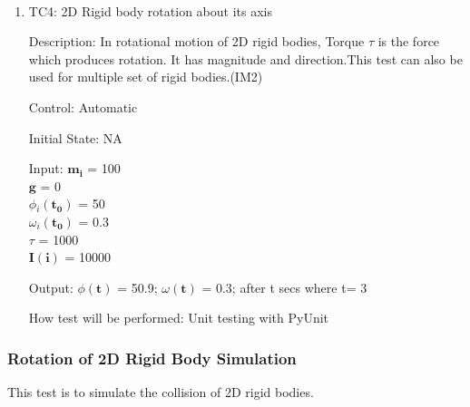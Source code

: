 \documentclass[12pt, titlepage]{article}
\begin{document}
\paragraph{}
\begin{enumerate}
	
	\item{TC4: 2D Rigid body rotation about its axis\\}
	
	Description: In rotational motion of 2D rigid bodies, Torque $\tau$ is the force which produces rotation. It has magnitude and direction.This test can also be used for multiple set of rigid bodies.(IM2)
	
	Control: Automatic
	
	Initial State: NA
	
	Input: $\mathbf{m_i}$$\mathbf{}$ = 100\\
	\hspace*{1.3cm}$\mathbf{g}$$\mathbf{}$ = 0\\
	\hspace*{1.3cm}$\phi$$_i\mathbf{(t_0)}$ = 50\\
	\hspace*{1.3cm}$\omega$$_i\mathbf{(t_0)}$$ \mathbf{}$ = 0.3\\
	\hspace*{1.3cm}$\tau$$\mathbf{}$ = 1000 \\
	\hspace*{1.3cm}$\mathbf{I}$$\mathbf{(i)}$ = 10000
	
	Output:  $\phi$$\mathbf{(t)}$ = 50.9;
	$\omega$$\mathbf{(t)}$ = 0.3; after t secs where t= 3 
	
	How test will be performed: Unit testing with PyUnit

\end{enumerate}


\subsubsection{Rotation of 2D Rigid Body Simulation}
This test is to simulate the collision of 2D rigid bodies.
\end{document}
